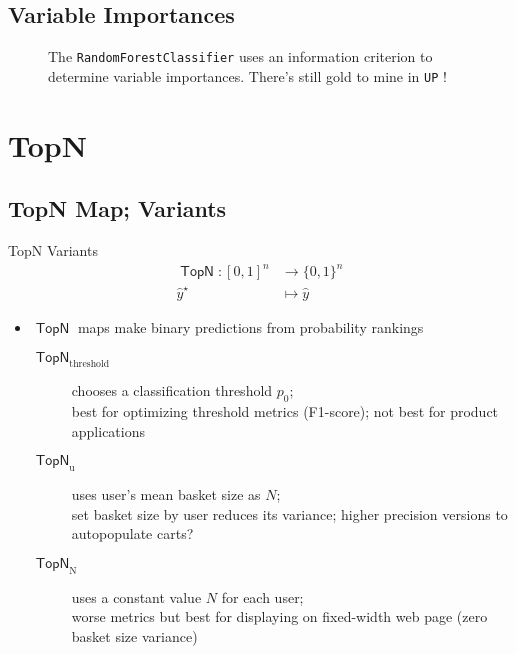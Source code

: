 \documentclass[handout]{beamer}
\begin{document}
\subsection{Variable Importances}

\begin{frame}
 \begin{figure}[]
\centering
\caption[\texttt{RandomForestClassifier} Variable Importance]{The \texttt{RandomForestClassifier} uses an information criterion to determine variable importances. There's still gold to mine in {\color{gold} \texttt{UP}} !}
\label{fig:variable-importances}
\end{figure}
\end{frame}



\section{TopN}

\subsection{TopN Map; Variants}

\begin{frame}
 
 \begin{block}{TopN Variants}
\setlength\abovedisplayskip{0pt}
\begin{equation*}\label{eq:top-n}
\begin{split}
\operatorname{\mathsf{TopN}} : {[0, 1]}^{n} &\rightarrow \{0, 1\}^n \\ 
\hat{y}^\star  &\mapsto \hat{y}
\end{split}
\end{equation*}%
\end{block}
 
\begin{itemize}
 \item $\operatorname{\mathsf{TopN}}$ maps make binary predictions from probability rankings
\begin{description}
 \item[$\operatorname{\mathsf{TopN}}_\text{threshold}$] chooses a classification threshold $p_0$;\\
 best for optimizing threshold metrics (F1-score); not best for product applications
\item[$\operatorname{\mathsf{TopN}}_\text{u}$] uses user's mean basket size as $N$;\\
set basket size by user reduces its variance;
higher precision versions to autopopulate carts?
\item[$\operatorname{\mathsf{TopN}}_\text{N}$]  uses a constant value $N$ for each user;\\
worse metrics but best for displaying on fixed-width web page (zero basket size variance)
\end{description}
\end{itemize}
\end{frame}
\end{document}
